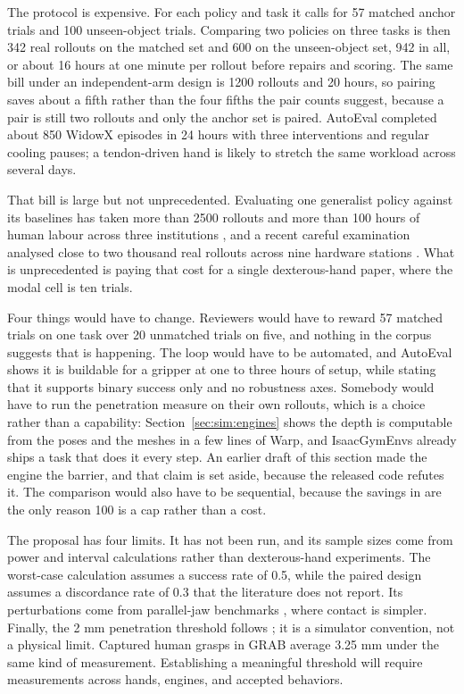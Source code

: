 \label{subsec:what_would_be_true}
The protocol is expensive. For each policy and task it calls for 57 matched anchor trials and 100
unseen-object trials. Comparing two policies on three tasks is then 342 real rollouts on the
matched set and 600 on the unseen-object set, 942 in all, or about 16 hours at one minute per
rollout before repairs and scoring. The same bill under an independent-arm design is 1200 rollouts
and 20 hours, so pairing saves about a fifth rather than the four fifths the pair counts suggest,
because a pair is still two rollouts and only the anchor set is paired. AutoEval
\cite{autoeval_2025} completed about 850 WidowX episodes in 24 hours with three interventions and
regular cooling pauses; a tendon-driven hand is likely to stretch the same workload across several
days.

That bill is large but not unprecedented. Evaluating one generalist policy against its baselines
has taken more than 2500 rollouts and more than 100 hours of human labour across three
institutions \cite{autoeval_2025}, and a recent careful examination analysed close to two thousand
real rollouts across nine hardware stations \cite{lbm_careful_examination_2025}. What is
unprecedented is paying that cost for a single dexterous-hand paper, where the modal cell is ten
trials.

Four things would have to change. Reviewers would have to reward 57 matched trials on one task
over 20 unmatched trials on five, and nothing in the corpus suggests that is happening. The loop
would have to be automated, and AutoEval \cite{autoeval_2025} shows it is buildable for a gripper
at one to three hours of setup, while stating that it supports binary success only and no
robustness axes. Somebody would have to run the penetration measure on their own rollouts, which
is a choice rather than a capability: Section~\ref{sec:sim:engines} shows the depth is computable
from the poses and the meshes in a few lines of Warp, and IsaacGymEnvs already ships a task that
does it every step. An earlier draft of this section made the engine the barrier, and that claim
is set aside, because the released code refutes it. The comparison would also have to be
sequential, because the savings in \cite{beyond_binary_success_2026} are the only reason 100 is a
cap rather than a cost.

The proposal has four limits. It has not been run, and its sample sizes come from power and
interval calculations rather than dexterous-hand experiments. The worst-case calculation
assumes a success rate of 0.5, while the paired design assumes a discordance rate of 0.3 that
the literature does not report. Its perturbations come from parallel-jaw benchmarks
\cite{colosseum_2024,simpler_2024}, where contact is simpler. Finally, the 2 mm penetration
threshold follows \cite{toporetarget_2026}; it is a simulator convention, not a physical limit.
Captured human grasps in GRAB \cite{grab_2020} average 3.25 mm under the same kind of
measurement. Establishing a meaningful threshold will require measurements across hands,
engines, and accepted behaviors.

